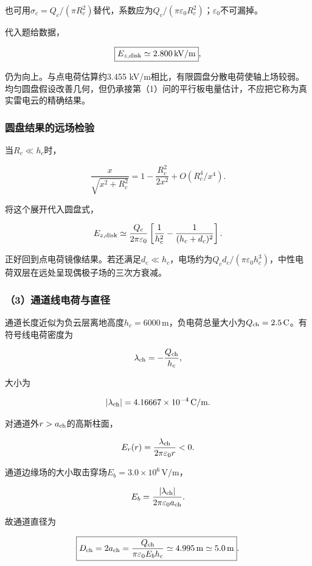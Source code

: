 \documentclass[12pt,a4paper,fontset=fandol]{ctexart}
\begin{document}
也可用\(\sigma_c=Q_c/(\pi R_c^2)\)替代，系数应为\(Q_c/(\pi\varepsilon_0R_c^2)\)；\(\varepsilon_0\)不可漏掉。

代入题给数据，

\[
\boxed{E_{z,\rm disk}\simeq
2.800\,\mathrm{kV/m}},
\]

仍为向上。与点电荷估算约3.455
kV/m相比，有限圆盘分散电荷使轴上场较弱。均匀圆盘假设改善几何，但仍承接第（1）问的平行板电量估计，不应把它称为真实雷电云的精确结果。

\subsubsection{圆盘结果的远场检验}\label{ux5706ux76d8ux7ed3ux679cux7684ux8fdcux573aux68c0ux9a8c}

当\(R_c\ll h_c\)时，

\[
\frac{x}{\sqrt{x^2+R_c^2}}
=1-\frac{R_c^2}{2x^2}
+O(R_c^4/x^4).
\]

将这个展开代入圆盘式，

\[
E_{z,\rm disk}
\simeq
\frac{Q_c}{2\pi\varepsilon_0}
\left[\frac1{h_c^2}
-\frac1{(h_c+d_c)^2}\right].
\]

正好回到点电荷镜像结果。若还满足\(d_c\ll h_c\)，电场约为\(Q_cd_c/(\pi\varepsilon_0h_c^3)\)，中性电荷双层在远处呈现偶极子场的三次方衰减。

\subsubsection{（3）通道线电荷与直径}\label{ux901aux9053ux7ebfux7535ux8377ux4e0eux76f4ux5f84}

通道长度近似为负云层离地高度\(h_c=6000\,\mathrm m\)，负电荷总量大小为\(Q_{\rm ch}=2.5\,\mathrm C\)。有符号线电荷密度为

\[
\lambda_{\rm ch}=-\frac{Q_{\rm ch}}{h_c},
\]

大小为

\[
|\lambda_{\rm ch}|
=4.16667\times10^{-4}\,\mathrm{C/m}.
\]

对通道外\(r>a_{\rm ch}\)的高斯柱面，

\[
E_r(r)=\frac{\lambda_{\rm ch}}
{2\pi\varepsilon_0r}<0.
\]

通道边缘场的大小取击穿场\(E_b=3.0\times10^6\,\mathrm{V/m}\)，

\[
E_b=\frac{|\lambda_{\rm ch}|}
{2\pi\varepsilon_0a_{\rm ch}}.
\]

故通道直径为

\[
\boxed{
D_{\rm ch}=2a_{\rm ch}
=\frac{Q_{\rm ch}}
{\pi\varepsilon_0E_bh_c}
\simeq4.995\,\mathrm m
\simeq5.0\,\mathrm m}.
\]
\end{document}
